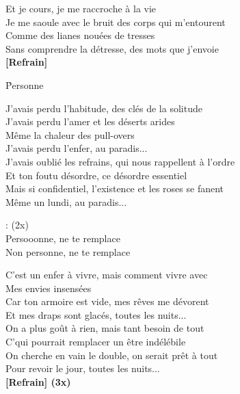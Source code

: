 \documentclass{novel}
\begin{document}
{{\begin{minipage}[t][0.5\textheight][t]{\textwidth}
\begin{multicols}{2}
Et je cours, je me raccroche à la vie\\
Je me saoule avec le bruit des corps qui m'entourent\\
Comme des lianes nouées de tresses\\
Sans comprendre la détresse, des mots que j'envoie\\

\textbf{[Refrain]}

\end{multicols}
\end{minipage}

\nointerlineskip
\begin{minipage}[b][0.55\textheight][t]{\textwidth}
\vspace{0.15\textheight}
\h*{Personne}

\begin{multicols}{2}
J'avais perdu l'habitude, des clés de la solitude\\
J'avais perdu l'amer et les déserts arides\\
Même la chaleur des pull-overs\\
J'avais perdu l'enfer, au paradis...\\

J'avais oublié les refrains, qui nous rappellent à l'ordre\\
Et ton foutu désordre, ce désordre essentiel\\
Mais si confidentiel, l'existence et les roses se fanent\\
Même un lundi, au paradis...\\

\begin{bfseries}
[Refrain]: (2x)\\
Persooonne, ne te remplace\\
Non personne, ne te remplace\\
\end{bfseries}
\columnbreak

C'est un enfer à vivre, mais comment vivre avec\\
Mes envies insensées\\
Car ton armoire est vide, mes rêves me dévorent\\
Et mes draps sont glacés, toutes les nuits...\\

On a plus goût à rien, mais tant besoin de tout\\
C'qui pourrait remplacer un être indélébile\\
On cherche en vain le double, on serait prêt à tout\\
Pour revoir le jour, toutes les nuits...\\

\textbf{[Refrain] (3x)}

\end{multicols}
\end{minipage}
}
}
\end{document}
